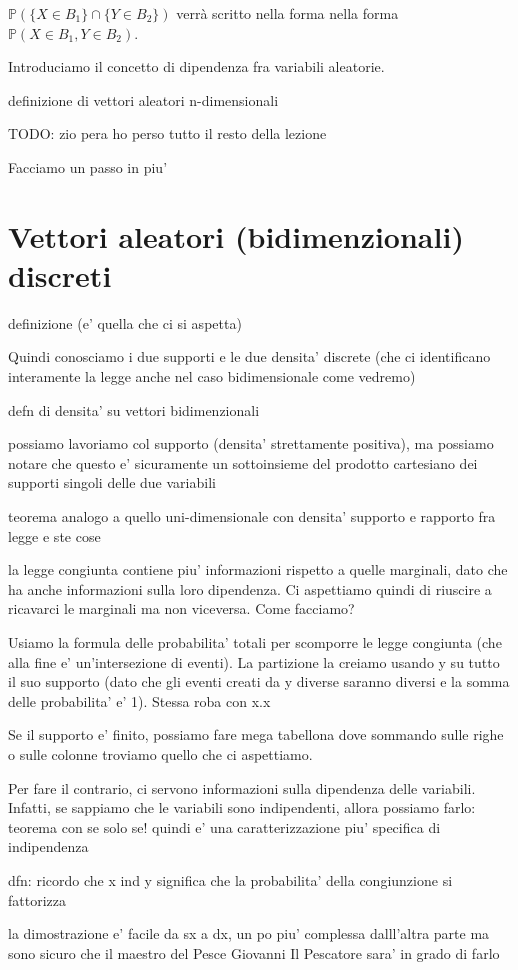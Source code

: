 
$\mathbb{P}(\{X \in B_1\} \cap \{Y \in B_2\})$ verrà scritto nella forma nella forma $\mathbb{P}(X \in B_1, Y \in B_2)$.



Introduciamo il concetto di dipendenza fra variabili aleatorie. 

definizione di vettori aleatori n-dimensionali

TODO: zio pera ho perso tutto il resto della lezione

Facciamo un passo in piu' 

\section{Vettori aleatori (bidimenzionali) discreti}

definizione (e' quella che ci si aspetta)

Quindi conosciamo i due supporti e le due densita' discrete (che ci identificano interamente la legge anche nel caso bidimensionale come vedremo)

defn di densita' su vettori bidimenzionali

possiamo lavoriamo col supporto (densita' strettamente positiva), ma possiamo notare che questo e' sicuramente un sottoinsieme del prodotto cartesiano dei supporti singoli delle due variabili

teorema analogo a quello uni-dimensionale con densita' supporto e rapporto fra legge e ste cose

la legge congiunta contiene piu' informazioni rispetto a quelle marginali, dato che ha anche informazioni sulla loro dipendenza. Ci aspettiamo quindi di riuscire a ricavarci le marginali ma non viceversa. Come facciamo?

Usiamo la formula delle probabilita' totali per scomporre le legge congiunta (che alla fine e' un'intersezione di eventi). La partizione la creiamo usando y su tutto il suo supporto (dato che gli eventi creati da y diverse saranno diversi e la somma delle probabilita' e' 1). Stessa roba con x.x

Se il supporto e' finito, possiamo fare mega tabellona dove sommando sulle righe o sulle colonne troviamo quello che ci aspettiamo. 

Per fare il contrario, ci servono informazioni sulla dipendenza delle variabili. Infatti, se sappiamo che le variabili sono indipendenti, allora possiamo farlo: teorema con se solo se! quindi e' una caratterizzazione piu' specifica di indipendenza

dfn:
ricordo che x ind y significa che la probabilita' della congiunzione si fattorizza

la dimostrazione e' facile da sx a dx, un po piu' complessa dalll'altra parte ma sono sicuro che il maestro del Pesce Giovanni Il Pescatore sara' in grado di farlo


% 
